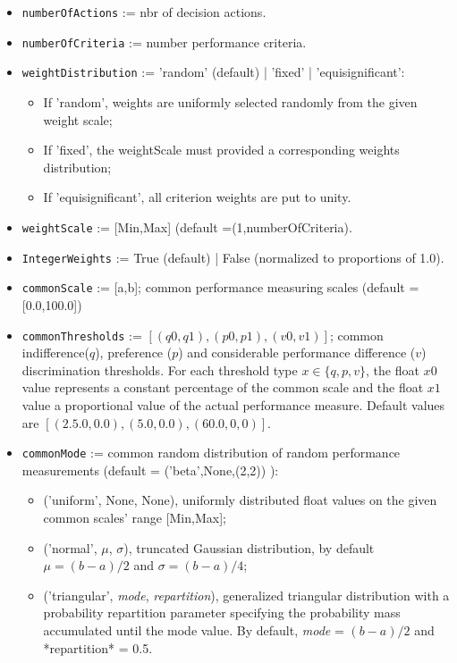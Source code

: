 \begin{itemize}
\item \texttt{numberOfActions} := nbr of decision actions.
\item \texttt{numberOfCriteria} := number performance criteria.
\item \texttt{weightDistribution} := 'random' (default) | 'fixed' | 'equisignificant':
      \begin{itemize}
         \item If 'random', weights are uniformly selected randomly from the given weight scale;
         \item If 'fixed', the weightScale must provided a corresponding weights distribution;
         \item If 'equisignificant', all criterion weights are put to unity.
      \end{itemize}
\item \texttt{weightScale} := [Min,Max] (default =(1,numberOfCriteria).
\item \texttt{IntegerWeights} := True (default) | False (normalized to proportions of 1.0).
\item \texttt{commonScale} := [a,b]; common performance measuring scales (default = [0.0,100.0])
\item \texttt{commonThresholds} := $[(q0,q1),(p0,p1),(v0,v1)]$; common indifference($q$), preference ($p$) and considerable performance difference ($v$) discrimination thresholds. For each threshold type $x \in \{q,p,v\}$, the float $x0$ value represents a constant percentage of the common scale and the float $x1$ value a proportional value of the actual performance measure. Default values are $[(2.5.0,0.0),(5.0,0.0),(60.0,0,0)]$. 
\item \texttt{commonMode} := common random distribution of random performance measurements (default = ('beta',None,(2,2)) ):
      \begin{itemize}
         \item  ('uniform', None, None), uniformly distributed float values on the given common scales' range [Min,Max];
         \item ('normal', $\mu$, $\sigma$), truncated Gaussian distribution, by default $\mu = (b-a)/2$ and $\sigma = (b-a)/4$;
         \item ('triangular', \emph{mode}, \emph{repartition}), generalized triangular distribution with a probability repartition parameter specifying the probability mass accumulated until the mode value. By default, \emph{mode} = $(b-a)/2$ and *repartition* = 0.5.

\end{itemize}
\end{itemize}
